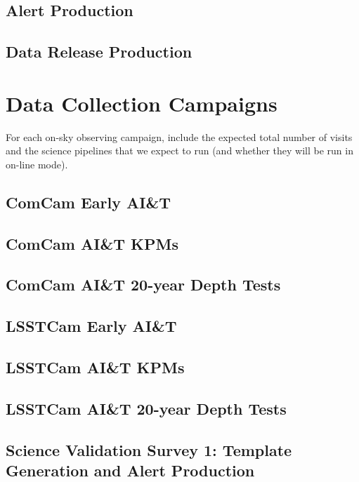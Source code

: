 \documentclass[DM,lsstdraft,toc]{lsstdoc}
\begin{document}
\subsection{Alert Production}

\subsection{Data Release Production}

\section{Data Collection Campaigns}

For each on-sky observing campaign, include the expected total number of visits and the science pipelines that we expect to run (and whether they will be run in on-line mode).

\subsection{ComCam Early AI\&T}

\subsection{ComCam AI\&T KPMs}

\subsection{ComCam AI\&T 20-year Depth Tests}

\subsection{LSSTCam Early AI\&T}

\subsection{LSSTCam AI\&T KPMs}

\subsection{LSSTCam AI\&T 20-year Depth Tests}

\subsection{Science Validation Survey 1: Template Generation and Alert Production}
\end{document}
